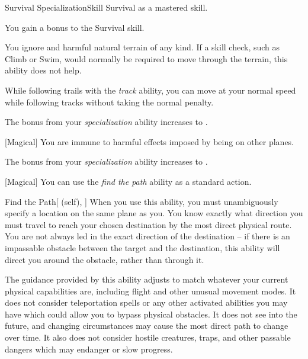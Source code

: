     \begin{feat}{Survival Specialization}{Skill}
        \featpre Survival as a mastered skill.

         You gain a  bonus to the Survival skill.

         You ignore  and harmful natural terrain of any kind.
        If a skill check, such as Climb or Swim, would normally be required to move through the terrain, this ability does not help.

        While following trails with the \textit{track} ability, you can move at your normal speed while following tracks without taking the normal  penalty.

         The bonus from your \textit{specialization} ability increases to .

        [Magical] You are immune to harmful effects imposed by being on other planes.

         The bonus from your \textit{specialization} ability increases to .

        [Magical] You can use the \textit{find the path} ability as a standard action.
        \begin{attuneability}{Find the Path}[ (self), ]
            When you use this ability, you must unambiguously specify a location on the same plane as you.
            You know exactly what direction you must travel to reach your chosen destination by the most direct physical route.
            You are not always led in the exact direction of the destination -- if there is an impassable obstacle between the target and the destination, this ability will direct you around the obstacle, rather than through it.

            The guidance provided by this ability adjusts to match whatever your current physical capabilities are, including flight and other unusual movement modes.
            It does not consider teleportation spells or any other activated abilities you may have which could allow you to bypass physical obstacles.
            It does not see into the future, and changing circumstances may cause the most direct path to change over time.
            It also does not consider hostile creatures, traps, and other passable dangers which may endanger or slow progress.
        \end{attuneability}
    \end{feat}


